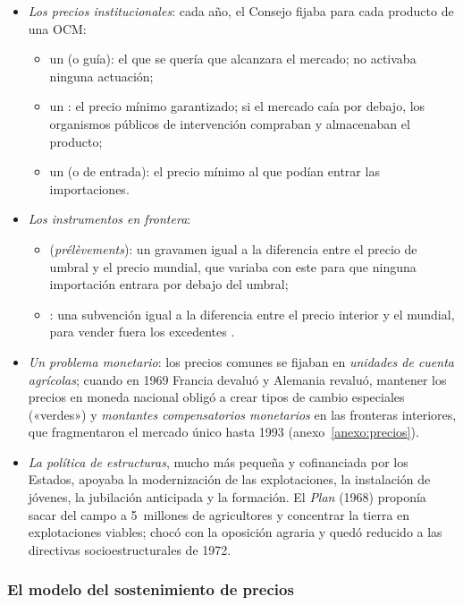 \documentclass[11pt]{article}
\begin{document}
\begin{itemize}
\item \emph{Los precios institucionales}: cada año, el Consejo fijaba para cada producto de una OCM:
  \begin{itemize}
  \item un  (o guía): el que se quería que alcanzara el mercado; no activaba ninguna actuación;
  \item un : el precio mínimo garantizado; si el mercado caía por debajo, los organismos públicos de intervención compraban y almacenaban el producto;
  \item un  (o de entrada): el precio mínimo al que podían entrar las importaciones.
  \end{itemize}
\item \emph{Los instrumentos en frontera}:
  \begin{itemize}
  \item {} (\emph{prélèvements}): un gravamen igual a la diferencia entre el precio de umbral y el precio mundial, que variaba con este para que ninguna importación entrara por debajo del umbral;
  \item {}: una subvención igual a la diferencia entre el precio interior y el mundial, para vender fuera los excedentes .
  \end{itemize}
\item \emph{Un problema monetario}: los precios comunes se fijaban en \emph{unidades de cuenta agrícolas}; cuando en 1969 Francia devaluó y Alemania revaluó, mantener los precios en moneda nacional obligó a crear tipos de cambio especiales («verdes») y \emph{montantes compensatorios monetarios} en las fronteras interiores, que fragmentaron el mercado único hasta 1993 (anexo~\ref{anexo:precios}).
\item \emph{La política de estructuras}, mucho más pequeña y cofinanciada por los Estados, apoyaba la modernización de las explotaciones, la instalación de jóvenes, la jubilación anticipada y la formación. El \emph{Plan } (1968) proponía sacar del campo a 5~millones de agricultores y concentrar la tierra en explotaciones viables; chocó con la oposición agraria y quedó reducido a las directivas socioestructurales de 1972.
\end{itemize}

\subsubsection{El modelo del sostenimiento de precios}\label{sec:modelo-precios}
\end{document}
